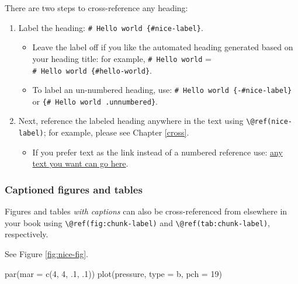\documentclass[
]{bxjsbook}
\newenvironment{Shaded}{\begin{snugshade}}{\end{snugshade}}
\newcommand{\AttributeTok}[1]{\textcolor[rgb]{0.77,0.63,0.00}{#1}}
\newcommand{\DecValTok}[1]{\textcolor[rgb]{0.00,0.00,0.81}{#1}}
\newcommand{\FunctionTok}[1]{\textcolor[rgb]{0.00,0.00,0.00}{#1}}
\newcommand{\NormalTok}[1]{#1}
\newcommand{\StringTok}[1]{\textcolor[rgb]{0.31,0.60,0.02}{#1}}
\providecommand{\tightlist}{%
  \setlength{\itemsep}{0pt}\setlength{\parskip}{0pt}}
\theoremstyle{definition}
\theoremstyle{definition}
\theoremstyle{definition}
\theoremstyle{definition}
\theoremstyle{remark}
\begin{document}
There are two steps to cross-reference any heading:

\begin{enumerate}
\def\labelenumi{\arabic{enumi}.}
\tightlist
\item
  Label the heading: \texttt{\#\ Hello\ world\ \{\#nice-label\}}.

  \begin{itemize}
  \tightlist
  \item
    Leave the label off if you like the automated heading generated based on your heading title: for example, \texttt{\#\ Hello\ world} = \texttt{\#\ Hello\ world\ \{\#hello-world\}}.
  \item
    To label an un-numbered heading, use: \texttt{\#\ Hello\ world\ \{-\#nice-label\}} or \texttt{\{\#\ Hello\ world\ .unnumbered\}}.
  \end{itemize}
\item
  Next, reference the labeled heading anywhere in the text using \texttt{\textbackslash{}@ref(nice-label)}; for example, please see Chapter \ref{cross}.

  \begin{itemize}
  \tightlist
  \item
    If you prefer text as the link instead of a numbered reference use: \protect\hyperlink{cross}{any text you want can go here}.
  \end{itemize}
\end{enumerate}

\hypertarget{captioned-figures-and-tables}{%
\subsubsection{Captioned figures and tables}\label{captioned-figures-and-tables}}

Figures and tables \emph{with captions} can also be cross-referenced from elsewhere in your book using \texttt{\textbackslash{}@ref(fig:chunk-label)} and \texttt{\textbackslash{}@ref(tab:chunk-label)}, respectively.

See Figure \ref{fig:nice-fig}.

\begin{Shaded}
\begin{Highlighting}[]
\FunctionTok{par}\NormalTok{(}\AttributeTok{mar =} \FunctionTok{c}\NormalTok{(}\DecValTok{4}\NormalTok{, }\DecValTok{4}\NormalTok{, .}\DecValTok{1}\NormalTok{, .}\DecValTok{1}\NormalTok{))}
\FunctionTok{plot}\NormalTok{(pressure, }\AttributeTok{type =} \StringTok{\textquotesingle{}b\textquotesingle{}}\NormalTok{, }\AttributeTok{pch =} \DecValTok{19}\NormalTok{)}
\end{Highlighting}
\end{Shaded}
\end{document}
